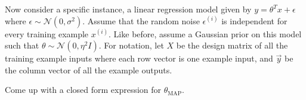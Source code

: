 \item {}
Now consider a specific instance, a linear regression model given by
$y=\theta^T x + \epsilon$ where $\epsilon \sim \mathcal{N}(0,\sigma^2)$. Assume
that the random noise $\epsilon^{(i)}$ is independent for every training example
$x^{(i)}$. Like before, assume a Gaussian prior on this model such that
$\theta \sim \mathcal{N}(0,\eta^2 I)$. For notation, let $X$ be the design
matrix of all the training example inputs where each row vector is one example
input, and $\vec{y}$ be the column vector of all the example outputs.

Come up with a closed form expression for $\theta_\text{MAP}$.

